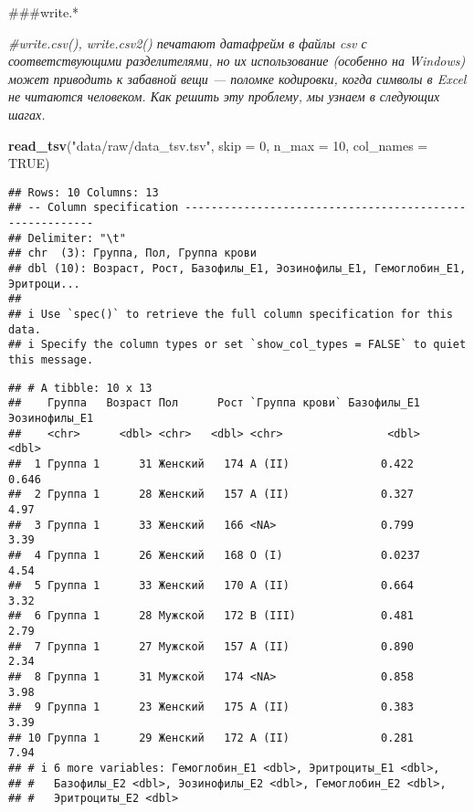 \documentclass[
]{article}
\newenvironment{Shaded}{\begin{snugshade}}{\end{snugshade}}
\newcommand{\AttributeTok}[1]{\textcolor[rgb]{0.13,0.29,0.53}{#1}}
\newcommand{\CommentTok}[1]{\textcolor[rgb]{0.56,0.35,0.01}{\textit{#1}}}
\newcommand{\ConstantTok}[1]{\textcolor[rgb]{0.56,0.35,0.01}{#1}}
\newcommand{\DecValTok}[1]{\textcolor[rgb]{0.00,0.00,0.81}{#1}}
\newcommand{\FunctionTok}[1]{\textcolor[rgb]{0.13,0.29,0.53}{\textbf{#1}}}
\newcommand{\NormalTok}[1]{#1}
\newcommand{\StringTok}[1]{\textcolor[rgb]{0.31,0.60,0.02}{#1}}
\begin{document}
\#\#\#write.*

\begin{Shaded}
\begin{Highlighting}[]
\CommentTok{\#write.csv(), write.csv2() печатают датафрейм в файлы csv с соответствующими разделителями, но их использование (особенно на Windows) может приводить к забавной вещи — поломке кодировки, когда символы в Excel не читаются человеком. Как решить эту проблему, мы узнаем в следующих шагах.}
\end{Highlighting}
\end{Shaded}

\begin{Shaded}
\begin{Highlighting}[]
\FunctionTok{read\_tsv}\NormalTok{(}\StringTok{"data/raw/data\_tsv.tsv"}\NormalTok{, }\AttributeTok{skip =} \DecValTok{0}\NormalTok{, }\AttributeTok{n\_max =} \DecValTok{10}\NormalTok{, }\AttributeTok{col\_names =} \ConstantTok{TRUE}\NormalTok{)}
\end{Highlighting}
\end{Shaded}

\begin{verbatim}
## Rows: 10 Columns: 13
## -- Column specification --------------------------------------------------------
## Delimiter: "\t"
## chr  (3): Группа, Пол, Группа крови
## dbl (10): Возраст, Рост, Базофилы_E1, Эозинофилы_E1, Гемоглобин_E1, Эритроци...
## 
## i Use `spec()` to retrieve the full column specification for this data.
## i Specify the column types or set `show_col_types = FALSE` to quiet this message.
\end{verbatim}

\begin{verbatim}
## # A tibble: 10 x 13
##    Группа   Возраст Пол      Рост `Группа крови` Базофилы_E1 Эозинофилы_E1
##    <chr>      <dbl> <chr>   <dbl> <chr>                <dbl>         <dbl>
##  1 Группа 1      31 Женский   174 A (II)              0.422          0.646
##  2 Группа 1      28 Женский   157 A (II)              0.327          4.97 
##  3 Группа 1      33 Женский   166 <NA>                0.799          3.39 
##  4 Группа 1      26 Женский   168 O (I)               0.0237         4.54 
##  5 Группа 1      33 Женский   170 A (II)              0.664          3.32 
##  6 Группа 1      28 Мужской   172 B (III)             0.481          2.79 
##  7 Группа 1      27 Мужской   157 A (II)              0.890          2.34 
##  8 Группа 1      31 Мужской   174 <NA>                0.858          3.98 
##  9 Группа 1      23 Женский   175 A (II)              0.383          3.39 
## 10 Группа 1      29 Женский   172 A (II)              0.281          7.94 
## # i 6 more variables: Гемоглобин_E1 <dbl>, Эритроциты_E1 <dbl>,
## #   Базофилы_E2 <dbl>, Эозинофилы_E2 <dbl>, Гемоглобин_E2 <dbl>,
## #   Эритроциты_E2 <dbl>
\end{verbatim}
\end{document}
